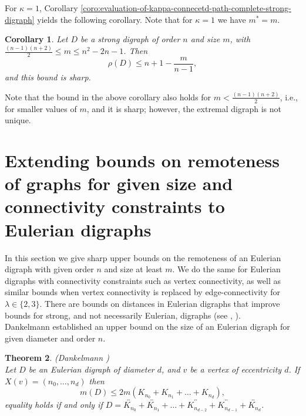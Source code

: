 \documentclass[a4paper,11pt]{article}
\newtheorem{theorem}{Theorem}[section]
\newtheorem{corollary}[theorem]%
{Corollary}
\begin{document}
For $\kappa=1$, Corollary \ref{coro:evaluation-of-kappa-connecetd-path-complete-strong-digraph} yields
the following corollary. Note that for $\kappa=1$ we have $m^*=m$.

\begin{corollary}   \label{coro:evaluation-of-path-complete digraph}
Let $D$ be a strong digraph of order $n$ and size $m$, with $ \frac{(n-1)(n+2)}{2} \leq m \leq n^2-2n-1$. Then 
\[ \rho(D) \leq  n+1-\frac{m}{n-1}, \]
and this bound is sharp.  
\end{corollary}

Note that the bound in the above corollary also holds for \( m < \frac{(n-1)(n+2)}{2} \), i.e., for smaller values of \( m \), and it is sharp; however, the extremal digraph is not unique.

 

\section{Extending bounds on remoteness of graphs for given size and connectivity constraints to Eulerian digraphs }

In this section we give sharp upper bounds on the remoteness of an Eulerian digraph with given order $n$ and size at least $m$. We do the same for Eulerian digraphs with connectivity constraints such as vertex connectivity, as well as similar bounds when vertex connectivity is replaced by edge-connectivity for $\lambda\in\{2, 3\}$. There are bounds on distances in Eulerian digraphs that improve bounds for strong, and not necessarily Eulerian, digraphs (see \cite{Dan2021}, \cite{Maf2020}).\\



Dankelmann \cite{Dan2021} established an upper bound on the size of an Eulerian digraph for given diameter and order \( n \). 

\begin{theorem}\label{th:m(D)}
{\rm (Dankelmann \cite{Dan2021})}\\
Let $D$ be an Eulerian digraph of diameter $d$, and $v$ be a vertex of eccentricity $d$. If $X(v)=(n_0,\ldots,n_d)$ then
\[m(D) \leq 2m(K_{n_0}+K_{n_1}+\ldots+K_{n_d}),\]
equality holds if and only if $D=\overleftrightarrow{K_{n_0}} + \overleftrightarrow{K_{n_1}} + \ldots + \overleftrightarrow{K_{n_{d-2}}} + \overleftrightarrow{K_{n_{d-1}}} + \overleftrightarrow{K_{n_d}}$.
\end{theorem}
\end{document}
